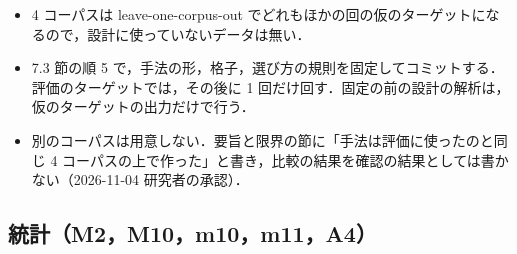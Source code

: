 \documentclass[11pt,a4paper]{ltjsarticle}
\begin{document}
\begin{itemize}
  \item 4 コーパスは leave-one-corpus-out でどれもほかの回の仮のターゲットになるので，設計に使っていないデータは無い．
  \item 7.3 節の順 5 で，手法の形，格子，選び方の規則を固定してコミットする．評価のターゲットでは，その後に 1 回だけ回す．固定の前の設計の解析は，仮のターゲットの出力だけで行う．
  \item 別のコーパスは用意しない．要旨と限界の節に「手法は評価に使ったのと同じ 4 コーパスの上で作った」と書き，比較の結果を確認の結果としては書かない（2026-11-04 研究者の承認）．
\end{itemize}

\subsection{統計（M2，M10，m10，m11，A4）}
\end{document}
